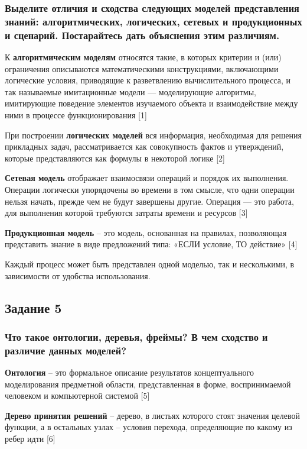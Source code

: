 \documentclass[14pt,a4paper,report]{report}
\begin{document}
\subsubsection{Выделите отличия и сходства следующих моделей представления знаний: алгоритмических, логических, сетевых и продукционных и сценарий. Постарайтесь дать объяснения этим различиям.}

К \textbf{алгоритмическим моделям} относятся такие, в которых критерии и (или) ограничения описываются математическими конструкциями, включающими логические условия, приводящие к разветвлению вычислительного процесса, и так называемые имитационные модели — моделирующие алгоритмы, имитирующие поведение элементов изучаемого объекта и взаимодействие между ними в процессе функционирования [1]

При построении \textbf{логических моделей} вся информация, необходимая для решения прикладных задач, рассматривается как совокупность фактов и утверждений, которые представляются как формулы в некоторой логике [2]

\textbf{Сетевая модель} отображает взаимосвязи операций и порядок их выполнения. Операции логически упорядочены во времени в том смысле, что одни операции нельзя начать, прежде чем не будут завершены другие. Операция — это работа, для выполнения которой требуются затраты времени и ресурсов [3]

\textbf{Продукционная модель} – это модель, основанная на правилах, позволяющая представить знание в виде предложений типа: «ЕСЛИ условие, ТО действие» [4]

Каждый процесс может быть представлен одной моделью, так и несколькими, в зависимости от удобства использования.

\subsection{Задание 5}

\subsubsection{Что такое онтологии, деревья, фреймы? В чем сходство и различие данных моделей?}

\textbf{Онтология} -- это формальное описание результатов концептуального моделирования предметной области, представленная в форме, воспринимаемой человеком и компьютерной системой [5]

\textbf{Дерево принятия решений} -- дерево, в листьях которого стоят значения целевой функции, а в остальных узлах -- условия перехода, определяющие по какому из ребер идти [6]
\end{document}
